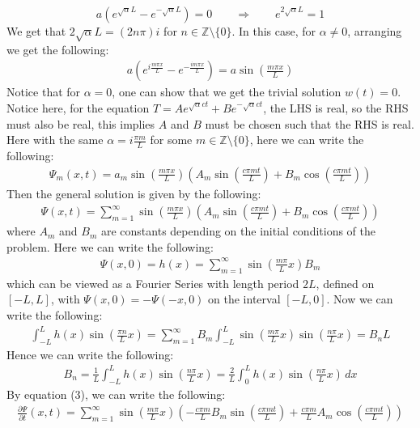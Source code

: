 \documentclass[11pt]{article}
\theoremstyle{break}
\theoremstyle{break}
\newcommand{\Z}{\mathbb{Z}}
\begin{document}
$$a\left(e^{\sqrt{\alpha}L} - e^{-\sqrt{\alpha}L} \right) = 0 \qquad \Rightarrow\qquad e^{2\sqrt{\alpha}L} = 1$$
We get that $2\sqrt{\alpha}L = (2n\pi)i$ for $n \in \Z\setminus\{0\}$. In this case, for $\alpha\neq 0$, arranging we get the following:
\begin{align*}
a\left(e^{i\frac{m\pi x}{L} }- e^{-\frac{im\pi x}{L}} \right)=a\sin\left(\frac{m\pi x}{L}\right)
\end{align*} 
Notice that for $\alpha = 0$, one can show that we get the trivial solution $w(t) = 0$. Notice here, for the equation $T=Ae^{\sqrt{\alpha}ct} + Be^{-\sqrt{\alpha}ct}$, the LHS is real, so the RHS must also be real, this implies $A$ and $B$ must be chosen such that the RHS is real. Here with the same $\alpha = i\frac{\pi m}{L}$ for some $m \in \Z\setminus \{0\}$, here we can write the following:
\begin{align*}
\Psi_m(x,t) = a_m \sin\left(\frac{m\pi x}{L}\right) \left(A_m \sin\left(\frac{c\pi mt}{L}\right)+ B_m\cos\left(\frac{c\pi mt}{L}\right) \right)
\end{align*}
Then the general solution is given by the following:
\begin{align*}
\Psi(x,t) = \sum_{m=1}^\infty \sin\left(\frac{m\pi x}{L}\right) \left(A_m \sin\left(\frac{c\pi mt}{L}\right)+ B_m\cos\left(\frac{c\pi mt}{L}\right) \right) \tag{3}
\end{align*}
where $A_m$ and $B_m$ are constants depending on the initial conditions of the problem. Here we can write the following:
\begin{align*}
\Psi(x,0) = h(x) = \sum_{m=1}^\infty \sin\left(\frac{m\pi}{L}x\right)B_m
\end{align*}
which can be viewed as a Fourier Series with length period $2L$, defined on $[-L,L]$, with $\Psi(x,0) = -\Psi(-x,0)$ on the interval $[-L,0]$. Now we can write the following:
\begin{align*}
\int_{-L}^L h(x) \sin\left(\frac{\pi n}{L}x\right) = \sum_{m=1}^\infty B_m \int_{-L}^L \sin\left( \frac{m\pi}{L}x\right) \sin\left(\frac{n\pi}{L}x\right) = B_n L
\end{align*}
Hence we can write the following:
\begin{align*}
B_n = \frac{1}{L} \int_{-L}^L h(x) \sin\left( \frac{n \pi}{L}x\right) = \frac{2}{L}\int_0^L h(x) \sin\left(\frac{n\pi}{L}x \right)\, dx
\end{align*}
By equation (3), we can write the following:
\begin{align*}
\frac{\partial \Psi}{\partial t}(x,t) = \sum_{m=1}^\infty \sin\left(\frac{m\pi}{L}x\right)\left(-\frac{c\pi m}{L}B_m \sin\left(\frac{c\pi mt}{L}\right) + \frac{c\pi m}{L}A_m \cos\left(\frac{c\pi mt}{L}\right)\right)
\end{align*}
\end{document}
